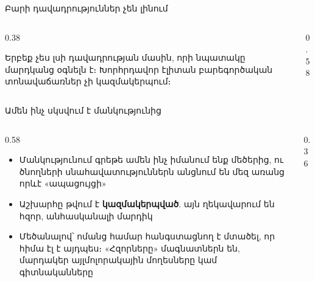 \begin{frame}{Բարի դավադրություններ չեն լինում}
  \begin{columns}[c]
    \begin{column}{0.38\textwidth}
      \begin{bookquote}
        Երբեք չես լսի դավադրության մասին, որի նպատակը մարդկանց օգնելն է։ Խորհրդավոր էլիտան բարեգործական տոնավաճառներ չի կազմակերպում։
      \end{bookquote}
    \end{column}
    \begin{column}{0.58\textwidth}
      \centering
    \end{column}
  \end{columns}
\end{frame}

\begin{frame}{Ամեն ինչ սկսվում է մանկությունից}
  \begin{columns}[c]
    \begin{column}{0.58\textwidth}
      \begin{itemize}
        \item Մանկությունում գրեթե ամեն ինչ իմանում ենք մեծերից, ու ծնողների սնահավատություններն անցնում են մեզ առանց որևէ «ապացույցի»
        \item<2-> Աշխարհը թվում է \textbf{կազմակերպված}. այն ղեկավարում են հզոր, անհասկանալի մարդիկ
        \item<3-> Մեծանալով՝ ոմանց համար հանգստացնող է մտածել, որ հիմա էլ է այդպես։ «Հզորները» մագնատներն են, մարդակեր այլմոլորակային մողեսները կամ գիտնականները
      \end{itemize}
    \end{column}
    \begin{column}{0.36\textwidth}
      \centering
      \ \par\medskip
    \end{column}
  \end{columns}
\end{frame}

